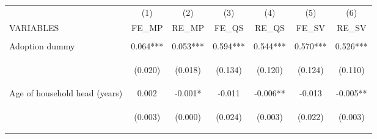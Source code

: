 \begin{center}
\begin{tabular}{lcccccc} \hline
 & (1) & (2) & (3) & (4) & (5) & (6) \\
VARIABLES & FE\_MP & RE\_MP & FE\_QS & RE\_QS & FE\_SV & RE\_SV \\ \hline
\vspace{4pt} & \begin{footnotesize}\end{footnotesize} & \begin{footnotesize}\end{footnotesize} & \begin{footnotesize}\end{footnotesize} & \begin{footnotesize}\end{footnotesize} & \begin{footnotesize}\end{footnotesize} & \begin{footnotesize}\end{footnotesize} \\
Adoption dummy & 0.064*** & 0.053*** & 0.594*** & 0.544*** & 0.570*** & 0.526*** \\
\vspace{4pt} & \begin{footnotesize}(0.020)\end{footnotesize} & \begin{footnotesize}(0.018)\end{footnotesize} & \begin{footnotesize}(0.134)\end{footnotesize} & \begin{footnotesize}(0.120)\end{footnotesize} & \begin{footnotesize}(0.124)\end{footnotesize} & \begin{footnotesize}(0.110)\end{footnotesize} \\
Age of household head (years) & 0.002 & -0.001* & -0.011 & -0.006** & -0.013 & -0.005** \\
\vspace{4pt} & \begin{footnotesize}(0.003)\end{footnotesize} & \begin{footnotesize}(0.000)\end{footnotesize} & \begin{footnotesize}(0.024)\end{footnotesize} & \begin{footnotesize}(0.003)\end{footnotesize} & \begin{footnotesize}(0.022)\end{footnotesize} & \begin{footnotesize}(0.003)\end{footnotesize} \\

\end{tabular}
\end{center}

